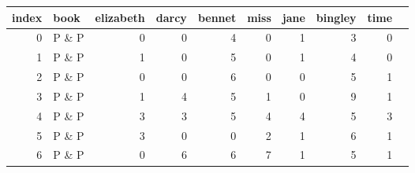 \begin{tabular}{rlrrrrrrrr}
  \hline
index & book & elizabeth & darcy & bennet & miss & jane & bingley & time \\ 
  \hline
  0 & P \& P &   0 &   0 &   4 &   0 &   1 &   3 &   0 \\ 
    1 & P \& P &   1 &   0 &   5 &   0 &   1 &   4 &   0 \\ 
    2 & P \& P &   0 &   0 &   6 &   0 &   0 &   5 &   1 \\ 
    3 & P \& P &   1 &   4 &   5 &   1 &   0 &   9 &   1 \\ 
    4 & P \& P &   3 &   3 &   5 &   4 &   4 &   5 &   3 \\ 
    5 & P \& P &   3 &   0 &   0 &   2 &   1 &   6 &   1 \\ 
    6 & P \& P &   0 &   6 &   6 &   7 &   1 &   5 &   1 \\ 
   \hline
\end{tabular}
